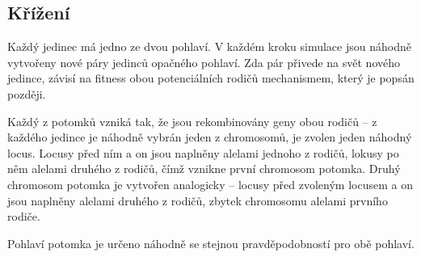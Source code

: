 \subsection{Křížení}

Každý jedinec má jedno ze dvou pohlaví. V každém kroku simulace jsou náhodně vytvořeny nové páry jedinců opačného
pohlaví. Zda pár přivede na svět nového jedince, závisí na fitness obou potenciálních rodičů mechanismem, který je
popsán později.

Každý z potomků vzniká tak, že jsou rekombinovány geny obou rodičů -- z každého jedince je náhodně vybrán jeden
z chromosomů, je zvolen jeden náhodný locus. Locusy před ním a on jsou naplněny alelami jednoho z rodičů,
lokusy po něm alelami druhého z rodičů, čímž vznikne první chromosom potomka. Druhý chromosom potomka je vytvořen
analogicky -- locusy před zvoleným locusem a on jsou naplněny alelami druhého z rodičů, zbytek chromosomu alelami
prvního rodiče.

Pohlaví potomka je určeno náhodně se stejnou pravděpodobností pro obě pohlaví.

